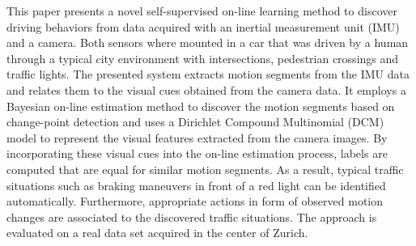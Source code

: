 This paper presents a novel self-supervised on-line learning method to
discover driving behaviors from data acquired with an inertial
measurement unit (IMU) and a camera. Both sensors where mounted in a
car that was driven by a human through a typical city environment with
intersections, pedestrian crossings and traffic lights. The presented
system extracts motion segments from the IMU data and relates them to
the visual cues obtained from the camera data. It employs a Bayesian
on-line estimation method to discover the motion segments based on
change-point detection and uses a Dirichlet Compound Multinomial (DCM)
model to represent the visual features extracted from the camera
images. By incorporating these visual cues into the on-line estimation
process, labels are computed that are equal for similar motion
segments. As a result, typical traffic situations such as braking
maneuvers in front of a red light can be identified
automatically. Furthermore, appropriate actions in form of observed
motion changes are associated to the discovered traffic
situations. The approach is evaluated on a real data set acquired in
the center of Zurich.
